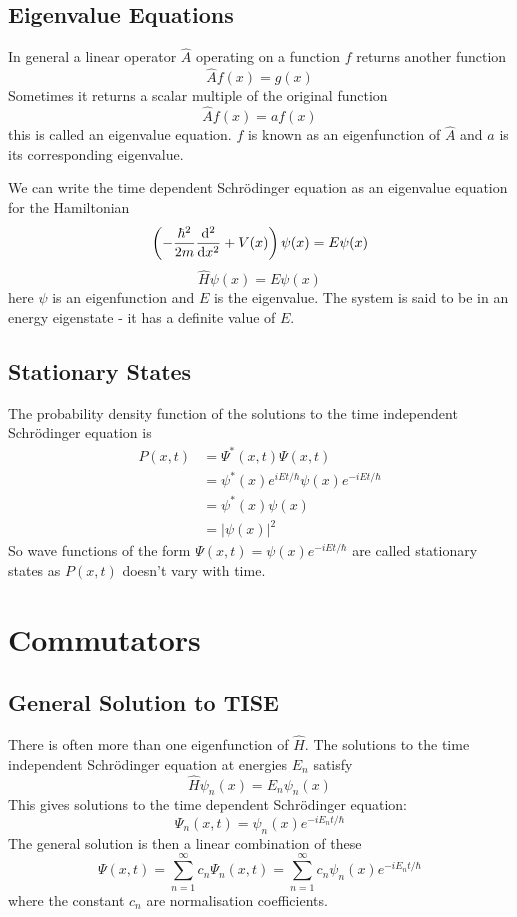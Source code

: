 \documentclass{article}
\begin{document}
    \subsection{Eigenvalue Equations}
    In general a linear operator \(\hat A\) operating on a function \(f\) returns another function
    \[\hat Af(x) = g(x)\]
    Sometimes it returns a scalar multiple of the original function
    \[\hat Af(x) = af(x)\]
    this is called an eigenvalue equation.
    \(f\) is known as an eigenfunction of \(\hat A\) and \(a\) is its corresponding eigenvalue.
    
    We can write the time dependent Schr\"odinger equation as an eigenvalue equation for the Hamiltonian
    \[\left(-\frac{\hbar^2}{2m}\dv[2]{x} + V(x)\right)\psi(x) = E\psi(x)\]
    \[\hat H \psi(x) = E\psi(x)\]
    here \(\psi\) is an eigenfunction and \(E\) is the eigenvalue.
    The system is said to be in an energy eigenstate - it has a definite value of \(E\).
    
    \subsection{Stationary States}
    The probability density function of the solutions to the time independent Schr\"odinger equation is
    \begin{align*}
        P(x, t) &= \Psi^*(x, t)\Psi(x, t)\\
        &= \psi^*(x)e^{iEt/\hbar}\psi(x)e^{-iEt/\hbar}\\
        &= \psi^*(x)\psi(x)\\
        &= |\psi(x)|^2
    \end{align*}
    So wave functions of the form \(\Psi(x, t) = \psi(x)e^{-iEt/\hbar}\) are called stationary states as \(P(x, t)\) doesn't vary with time.
    
    \section{Commutators}
    \subsection{General Solution to TISE}
    There is often more than one eigenfunction of \(\hat H\).
    The solutions to the time independent Schr\"odinger equation at energies \(E_n\) satisfy
    \[\hat H\psi_n(x) = E_n\psi_n(x)\]
    This gives solutions to the time dependent Schr\"odinger equation:
    \[\Psi_n(x, t) = \psi_n(x)e^{-iE_nt/\hbar}\]
    The general solution is then a linear combination of these
    \[\Psi(x, t) = \sum_{n = 1}^\infty c_n \Psi_n(x, t) = \sum_{n = 1}^\infty c_n \psi_n(x)e^{-iE_nt/\hbar}\]
    where the constant \(c_n\) are normalisation coefficients.
    
\end{document}
